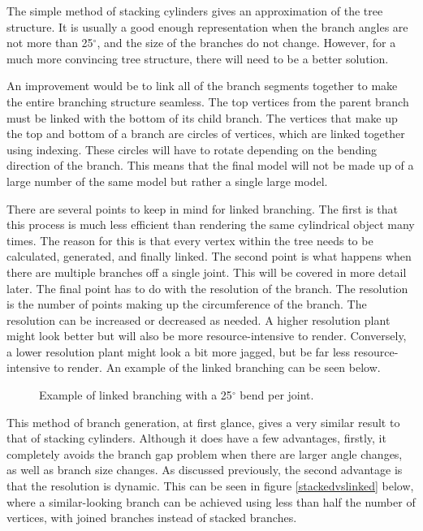 \FloatBarrier

\noindent
The simple method of stacking cylinders gives an approximation of the tree structure. It is usually a good enough representation when the branch angles are not more than 25$^{\circ}$, and the size of the branches do not change. However, for a much more convincing tree structure, there will need to be a better solution. 

An improvement would be to link all of the branch segments together to make the entire branching structure seamless. The top vertices from the parent branch must be linked with the bottom of its child branch. The vertices that make up the top and bottom of a branch are circles of vertices, which are linked together using indexing. These circles will have to rotate depending on the bending direction of the branch. This means that the final model will not be made up of a large number of the same model but rather a single large model. 

There are several points to keep in mind for linked branching. The first is that this process is much less efficient than rendering the same cylindrical object many times. The reason for this is that every vertex within the tree needs to be calculated, generated, and finally linked. The second point is what happens when there are multiple branches off a single joint. This will be covered in more detail later. The final point has to do with the resolution of the branch. The resolution is the number of points making up the circumference of the branch. The resolution can be increased or decreased as needed. A higher resolution plant might look better but will also be more resource-intensive to render. Conversely, a lower resolution plant might look a bit more jagged, but be far less resource-intensive to render. An example of the linked branching can be seen below.

\begin{figure}[htbp]
	{\centering
		\vspace{7px}
		\setlength{\fboxrule}{1pt}
		\caption{Example of linked branching with a 25$^{\circ}$ bend per joint.}
	}
\end{figure}
\FloatBarrier

\noindent
This method of branch generation, at first glance, gives a very similar result to that of stacking cylinders. Although it does have a few advantages, firstly, it completely avoids the branch gap problem when there are larger angle changes, as well as branch size changes. As discussed previously, the second advantage is that the resolution is dynamic. This can be seen in figure \ref{stackedvslinked} below, where a similar-looking branch can be achieved using less than half the number of vertices, with joined branches instead of stacked branches.


